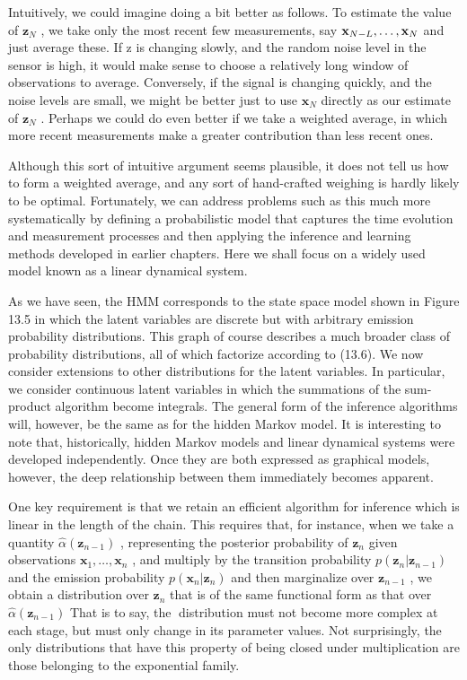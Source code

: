 \documentclass[
  10
]{article}
\begin{document}
Intuitively, we could imagine doing a bit better as follows. To estimate
the value of \(\mathbf { z } _ { N }\) , we take only the most recent
few measurements, say
\({ \bf x } _ { N - L } , \ldots , { \bf x } _ { N }\) and just average
these. If z is changing slowly, and the random noise level in the sensor
is high, it would make sense to choose a relatively long window of
observations to average. Conversely, if the signal is changing quickly,
and the noise levels are small, we might be better just to use
\(\mathbf { x } _ { N }\) directly as our estimate of
\(\mathbf { z } _ { N }\) . Perhaps we could do even better if we take a
weighted average, in which more recent measurements make a greater
contribution than less recent ones.

Although this sort of intuitive argument seems plausible, it does not
tell us how to form a weighted average, and any sort of hand-crafted
weighing is hardly likely to be optimal. Fortunately, we can address
problems such as this much more systematically by defining a
probabilistic model that captures the time evolution and measurement
processes and then applying the inference and learning methods developed
in earlier chapters. Here we shall focus on a widely used model known as
a linear dynamical system.

As we have seen, the HMM corresponds to the state space model shown in
Figure 13.5 in which the latent variables are discrete but with
arbitrary emission probability distributions. This graph of course
describes a much broader class of probability distributions, all of
which factorize according to (13.6). We now consider extensions to other
distributions for the latent variables. In particular, we consider
continuous latent variables in which the summations of the sum-product
algorithm become integrals. The general form of the inference algorithms
will, however, be the same as for the hidden Markov model. It is
interesting to note that, historically, hidden Markov models and linear
dynamical systems were developed independently. Once they are both
expressed as graphical models, however, the deep relationship between
them immediately becomes apparent.

One key requirement is that we retain an efficient algorithm for
inference which is linear in the length of the chain. This requires
that, for instance, when we take a quantity
\(\widehat { \alpha } ( \mathbf { z } _ { n - 1 } )\) , representing the
posterior probability of \(\mathbf { z } _ { n }\) given observations
\(\mathbf { x } _ { 1 } , \ldots , \mathbf { x } _ { n }\) , and
multiply by the transition probability
\(p ( \mathbf { z } _ { n } | \mathbf { z } _ { n - 1 } )\) and the
emission probability
\(p ( \mathbf { x } _ { n } | \mathbf { z } _ { n } )\) and then
marginalize over \(\mathbf { z } _ { n - 1 }\) , we obtain a
distribution over \(\mathbf { z } _ { n }\) that is of the same
functional form as that over
\(\widehat { \alpha } ( \mathbf { z } _ { n - 1 } )\) That is to say,
the distribution must not become more complex at each stage, but must
only change in its parameter values. Not surprisingly, the only
distributions that have this property of being closed under
multiplication are those belonging to the exponential family.
\end{document}
